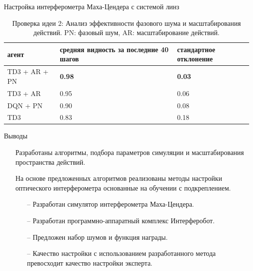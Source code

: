 \begin{frame}[allowframebreaks]{Настройка интерферометра Маха-Цендера с системой линз}
\begin{table} [htbp]
    \centering
    \begin{threeparttable}
        \caption*{{\color{orange}Проверка идеи 2:} Анализ эффективности фазового шума и масштабирования действий. PN: фазовый шум, AR: масштабирование действий.}
        \begin{tabular}{| p{3cm} || p{3cm} || p{3cm} |}
            \hline
            \hline
            агент & средняя видность за последние 40 шагов & стандартное отклонение \\
            \hline
            TD3 + AR + PN & \textbf{0.98} & \textbf{0.03} \\
            TD3 + AR & 0.95 & 0.06\\
            DQN + PN & 0.90 & 0.08\\
            TD3& 0.83 & 0.18\\
            \hline
            \hline
        \end{tabular}
    \end{threeparttable}
\end{table}

\end{frame}


\begin{frame}{Выводы}
\begin{itemize}
    \item[\textcolor{ForestGreen}{\checkmark}] Разработаны алгоритмы, подбора параметров симуляции и масштабирования пространства действий. 
    \item[\textcolor{ForestGreen}{\checkmark}] На основе предложенных алгоритмов реализованы методы настройки оптического интерферометра основанные на обучении с подкреплением.
    \begin{itemize}
        \item[--] Разработан симулятор интерферометра Маха-Цендера.
        \item[--] Разработан программно-аппаратный комплекс Интерферобот.
        \item[--] Предложен набор шумов и функция награды.
        \item[--] Качество настройки с использованием разработанного метода превосходит качество настройки эксперта.
    \end{itemize}
    
    
\end{itemize}
    



\end{frame}


